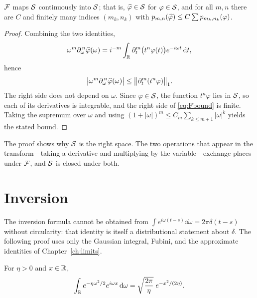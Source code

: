 \begin{theorem}\label{prop:F-S}
$\mathcal{F}$ maps $\mathcal{S}$ continuously into $\mathcal{S}$; that is, $\widehat{\varphi}\in\mathcal{S}$ for $\varphi\in\mathcal{S}$, and for all
$m,n$ there are $C$ and finitely many indices $(m_{k},n_{k})$ with
$p_{m,n}(\widehat{\varphi})\le C\sum p_{m_{k},n_{k}}(\varphi)$.
\end{theorem}

\begin{proof}
Combining the two identities,
\begin{equation}
\omega^{m}\partial_{\omega}^{\,n}\widehat{\varphi}(\omega)
=i^{-m}\int_{\mathbb{R}}\partial_{t}^{m}\big(t^{n}\varphi(t)\big)e^{-i\omega t}\,\mathrm{d} t ,
\end{equation}
hence
\begin{equation}
\big|\omega^{m}\partial_{\omega}^{\,n}\widehat{\varphi}(\omega)\big|
\le\big\|\partial_{t}^{m}(t^{n}\varphi)\big\|_{1} .
\label{eq:Fbound}
\end{equation}
The right side does not depend on $\omega$. Since $\varphi\in\mathcal{S}$, the function $t^{n}\varphi$ lies in
$\mathcal{S}$, so each of its derivatives is integrable, and the right side of \eqref{eq:Fbound} is finite.
Taking the supremum over $\omega$ and using $(1+|\omega|)^{m}\le C_{m}\sum_{k\le m+1}|\omega|^{k}$
yields the stated bound.
\end{proof}

The proof shows why $\mathcal{S}$ is the right space. The two operations that appear in the transform---taking
a derivative and multiplying by the variable---exchange places under $\mathcal{F}$, and $\mathcal{S}$ is closed under
both.

\section{Inversion}

The inversion formula cannot be obtained from
$\int e^{i\omega(t-s)}\dd\omega=2\pi\delta(t-s)$ without circularity: that identity is itself a
distributional statement about $\delta$. The following proof uses only the Gaussian integral, Fubini,
and the approximate identities of Chapter~\ref{ch:limits}.

\begin{lemma}\label{lem:gauss}
For $\eta>0$ and $x\in\mathbb{R}$,
\begin{equation}
\int_{\mathbb{R}}e^{-\eta\omega^{2}/2}e^{i\omega x}\,\mathrm{d}\omega=\sqrt{\frac{2\pi}{\eta}}\;e^{-x^{2}/(2\eta)} .
\label{eq:gaussint}
\end{equation}
\end{lemma}

